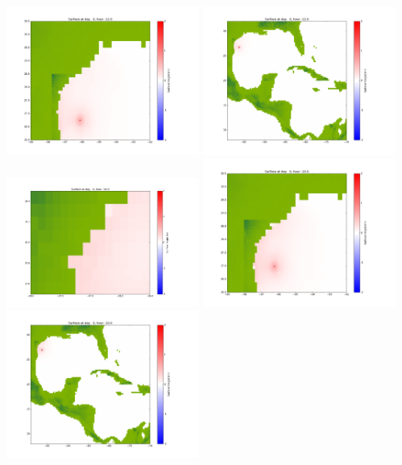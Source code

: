 \documentclass[11pt]{article}
\begin{document}
\includegraphics[width=0.475\textwidth]{frame0018fig1002.png}
\vskip 10pt 
\includegraphics[width=0.475\textwidth]{frame0018fig1003.png}
\vskip 10pt 
\includegraphics[width=0.475\textwidth]{frame0019fig1001.png}
\includegraphics[width=0.475\textwidth]{frame0019fig1002.png}
\vskip 10pt 
\includegraphics[width=0.475\textwidth]{frame0019fig1003.png}
\end{document}

